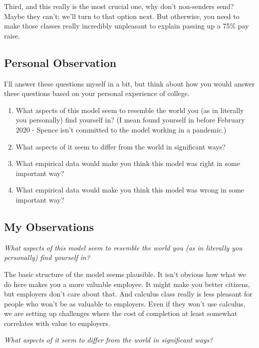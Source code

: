 \documentclass[
  11pt,
]{article}
\providecommand{\tightlist}{%
  \setlength{\itemsep}{0pt}\setlength{\parskip}{0pt}}
\begin{document}
Third, and this really is the most crucial one, why don't non-senders
send? Maybe they can't; we'll turn to that option next. But otherwise,
you need to make those classes really incredibly unpleasant to explain
passing up a 75\% pay raise.

\hypertarget{personal-observation}{%
\subsection{Personal Observation}\label{personal-observation}}

I'll answer these questions myself in a bit, but think about how you
would answer these questions based on your personal experience of
college.

\begin{enumerate}
\def\labelenumi{\arabic{enumi}.}
\tightlist
\item
  What aspects of this model seem to resemble the world you (as in
  literally you personally) find yourself in? (I mean found yourself in
  before February 2020 - Spence isn't committed to the model working in
  a pandemic.)
\item
  What aspects of it seem to differ from the world in significant ways?
\item
  What empirical data would make you think this model was right in some
  important way?
\item
  What empirical data would make you think this model was wrong in some
  important way?
\end{enumerate}

\hypertarget{my-observations}{%
\subsection{My Observations}\label{my-observations}}

\emph{What aspects of this model seem to resemble the world you (as in
literally you personally) find yourself in?}

The basic structure of the model seems plausible. It isn't obvious how
what we do here makes you a more valuable employee. It might make you
better citizens, but employers don't care about that. And calculus class
really is less pleasant for people who won't be as valuable to
employers. Even if they won't use calculus, we are setting up challenges
where the cost of completion at least somewhat correlates with value to
employers.

\emph{What aspects of it seem to differ from the world in significant
ways?}
\end{document}
